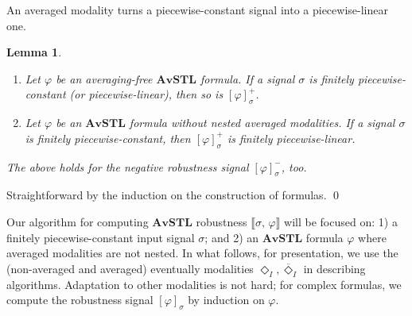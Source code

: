 \documentclass[envcountsect,orivec]{llncs} \usepackage{etex} \usepackage[]{graphicx}
\newtheorem{mylemma}[mytheorem]{Lemma}
\def\myqed{\qed}
\newcommand{\DiaOp}[1]{\Diamond_{#1}}
\newcommand{\TDiaOp}[1]{\overline{\Diamond}_{#1}}
\newcommand{\Robust}[2]{{ \llbracket #1,\, #2 \rrbracket}}
\newcommand{\AvSTL}{\textbf{AvSTL}}
\begin{document}
\noindent
An averaged modality turns a piecewise-constant signal into a
piecewise-linear one.
\begin{mylemma}\label{lem:preservationOfPiecewiseConstLinear}
 \begin{enumerate}
  \item Let $\varphi$ be an averaging-free $\AvSTL$ formula.
	If a signal $\sigma$ is finitely piecewise-constant (or
	piecewise-linear), then so is $[\varphi]^{+}_{\sigma}$.
  \item Let $\varphi$ be an $\AvSTL$ formula without nested averaged
	modalities.
	If a signal $\sigma$ is finitely piecewise-constant, then
 $[\varphi]^{+}_{\sigma}$ is finitely piecewise-linear.
 \end{enumerate}
\noindent
The above holds for the negative robustness signal
 $[\varphi]^{-}_{\sigma}$, too.
\end{mylemma}
\begin{myproof}
 Straightforward by the induction on the construction of formulas.
 \myqed
\end{myproof}

Our algorithm for computing $\AvSTL$ robustness 
$\Robust{\sigma}{\varphi}$ will be focused on: 
1) a finitely piecewise-constant input signal $\sigma$; and 
2) an $\AvSTL$ formula $\varphi$ where averaged modalities are not nested.
In what follows, for presentation, we use the (non-averaged and averaged) 
eventually modalities $\DiaOp{I},\TDiaOp{I}$ in describing algorithms. 
Adaptation to other modalities is not hard; 
for complex formulas, we compute
the robustness signal $[\varphi]_{\sigma}$ by induction on $\varphi$.
\end{document}
